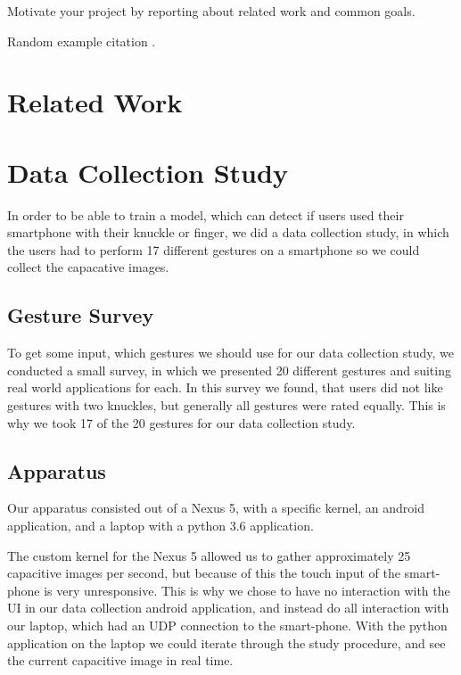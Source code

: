 \documentclass[sigchi-a, authorversion]{acmart}
\begin{document}
Motivate your project by reporting about related work and common goals.

Random example citation \cite{Le:2018:PalmTouch}.
\section{Related Work}

\section{Data Collection Study}
In order to be able to train a model, which can detect if users used their smartphone with their knuckle or finger, we did a data collection study, in which the users had to perform 17 different gestures on a smartphone so we could collect the capacative images.

\subsection{Gesture Survey}
To get some input, which gestures we should use for our data collection study, we conducted a small survey, in which we presented 20 different gestures and suiting real world applications for each.
In this survey we found, that users did not like gestures with two knuckles, but generally all gestures were rated equally.
This is why we took 17 of the 20 gestures for our data collection study.


\subsection{Apparatus}
Our apparatus consisted out of a Nexus 5, with a specific kernel, an android application, and a laptop with a python 3.6 application.

The custom kernel for the Nexus 5 allowed us to gather approximately 25 capacitive images per second, but because of this the touch input of the smart-phone is very unresponsive.
This is why we chose to have no interaction with the UI in our data collection android application, and instead do all interaction with our laptop, which had an UDP connection to the smart-phone.
With the python application on the laptop we could iterate through the study procedure, and see the current capacitive image in real time.
\end{document}
